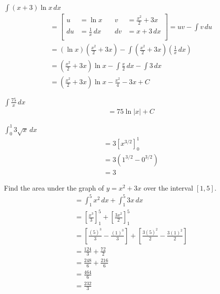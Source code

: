 \documentclass[12pt]{article}
\newenvironment{problem}[2][]{
    \begin{trivlist}
        \item[
            {\bfseries #1}
            {\bfseries #2.}
        ]
}{\end{trivlist}}
\newcommand{\dx}{\, dx}
\newcommand{\setuv}[4]{
\left[
\begin{alignedat}{2}
u &= #1 &\quad v &= #3 \\
du &= #2 &\quad dv &= #4 \\
\end{alignedat}
\right]  = uv - \int v \, du \\
&= \intbp{#1}{#3}{#2}
}
\newcommand{\intbp}[3]{\left(#1\right) \left(#2\right) - \int \left(#2\right) \left(#3\right)}
\begin{document}
\begin{problem}{41}
    $\displaystyle\int \left(x + 3\right) \ln x \dx$
    \begin{align}
        &= \setuv{\ln x}{\frac{1}{x} \dx}{\frac{x^2}{2} + 3x}{x + 3 \dx} \\
        &= \left(\frac{x^2}{2} + 3x\right) \ln x - \int \frac{x}{2} \dx - \int 3 \dx \\
        &= \left(\frac{x^2}{2} + 3x\right) \ln x - \frac{x^2}{4} - 3x + C
    \end{align}
\end{problem}

\begin{problem}{42}
    $\displaystyle\int \frac{75}{x} \dx$
    \begin{align}
        &= 75 \ln \left|x\right| + C
    \end{align}
\end{problem}

\begin{problem}{43}
    $\displaystyle\int_0^1 3\sqrt{x} \dx$
    \begin{align}
        &= 3 \left[x^{3/2}\right]_0^1 \\
        &= 3 \left(1^{3/2} - 0^{3/2}\right) \\
        &= 3
    \end{align}
\end{problem}

\begin{problem}{44}
    Find the area under the graph of $y = x^2 + 3x$ over the interval $[1, 5]$.
    \begin{align}
        &= \int_1^5 x^2 \dx + \int_1^5 3x \dx \\
        &= \left[\frac{x^3}{3}\right]_1^5 + \left[\frac{3x^2}{2}\right]_1^5 \\
        &= \left[\frac{\left(5\right)^3}{3} - \frac{\left(1\right)^3}{3}\right] + \left[\frac{3\left(5\right)^2}{2} - \frac{3\left(1\right)^2}{2}\right] \\
        &= \frac{124}{3} + \frac{72}{2} \\
        &= \frac{248}{6} + \frac{216}{6} \\
        &= \frac{464}{6} \\
        &= \frac{232}{3}
    \end{align}
\end{problem}
\end{document}
